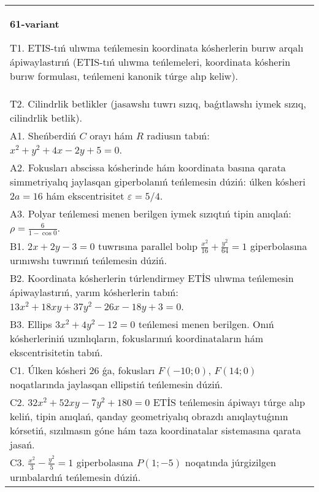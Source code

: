 \documentclass{article}
\begin{document}
\begin{tabular}{m{17cm}}
\textbf{61-variant}
\newline

T1. ETIS-tıń ulıwma teńlemesin koordinata kósherlerin burıw arqalı ápiwaylastırıń (ETIS-tıń ulıwma teńlemeleri, koordinata kósherin burıw formulası, teńlemeni kanonik túrge alıp keliw).\\

T2. Cilindrlik betlikler (jasawshı tuwrı sızıq, baǵıtlawshı iymek sızıq, cilindrlik betlik).\\

A1. Sheńberdiń $C$ orayı hám $R$ radiusın tabıń: $x^2+y^2+4 x-2 y+5=0$.\\

A2. Fokusları abscissa kósherinde hám koordinata basına qarata simmetriyalıq jaylasqan giperbolanıń teńlemesin dúziń: úlken kósheri $2 a=16$ hám ekscentrisitet $\varepsilon=5/4$.\\

A3. Polyar teńlemesi menen berilgen iymek sızıqtıń tipin anıqlań: $\rho=\frac{6}{1-\cos 0}$.\\

B1. $2x + 2y - 3 = 0$ tuwrısına parallel bolıp $\frac{x^{2}}{16} + \frac{y^{2}}{64} = 1$ giperbolasına urınıwshı tuwrınıń teńlemesin dúziń.  \\

B2. Koordinata kósherlerin túrlendirmey ETİS ulıwma teńlemesin ápiwaylastırıń, yarım kósherlerin tabıń: $13x^{2} + 18xy + 37y^{2} - 26x - 18y + 3 = 0$.  \\

B3. Ellips $3x^{2} + 4y^{2} - 12 = 0$ teńlemesi menen berilgen. Onıń kósherleriniń uzınlıqların, fokuslarınıń koordinataların hám ekscentrisitetin tabıń.  \\

C1. Úlken kósheri 26 ǵa, fokusları $F( - 10;0)$, $F(14;0)$ noqatlarında jaylasqan ellipstiń teńlemesin dúziń.  \\

C2. $32x^{2} + 52xy - 7y^{2} + 180 = 0$ ETİS teńlemesin ápiwayı túrge alıp keliń, tipin anıqlań, qanday geometriyalıq obrazdı anıqlaytuǵının kórsetiń, sızılmasın góne hám taza koordinatalar sistemasına qarata jasań.  \\

C3. $\frac{x^{2}}{3} - \frac{y^{2}}{5} = 1$ giperbolasına $P(1; - 5)$ noqatında júrgizilgen urınbalardıń teńlemesin dúziń.\\

\end{tabular}
\vspace{1cm}
\end{document}
